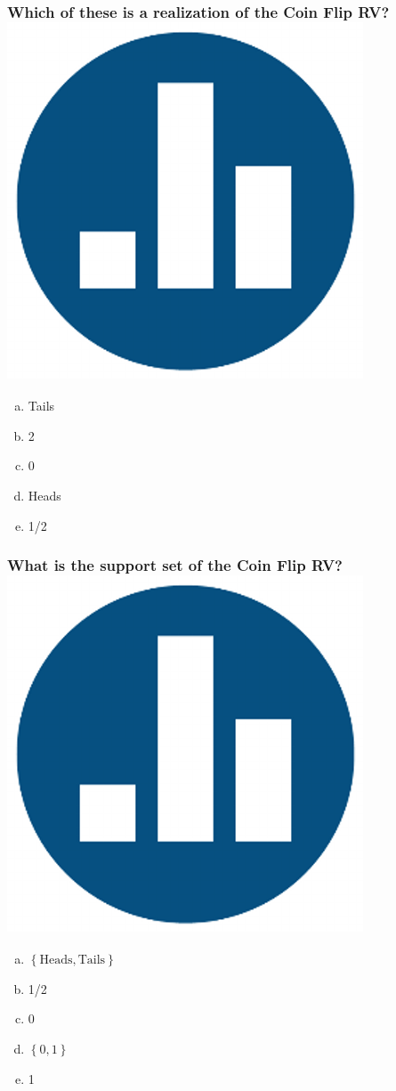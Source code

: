 \documentclass[handout]{beamer}
\begin{document}
\begin{frame}
  \frametitle{Which of these is a realization of the Coin Flip RV?\hfill\includegraphics[scale = 0.05]{./images/clicker}}
  \begin{enumerate}[(a)]
    \item Tails
    \item 2
    \item 0 
    \item Heads
    \item 1/2
  \end{enumerate}
\end{frame}
\begin{frame}
  \frametitle{What is the support set of the Coin Flip RV?\hfill\includegraphics[scale = 0.05]{./images/clicker}}
  \begin{enumerate}[(a)]
    \item $\left\{ \mbox{Heads}, \mbox{Tails} \right\}$ 
    \item 1/2 
    \item 0 
    \item $\left\{ 0,1 \right\}$
    \item 1
  \end{enumerate}
\end{frame}
\end{document}
